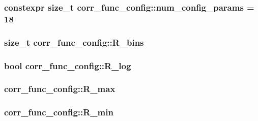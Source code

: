 \subsubsection[{num\+\_\+config\+\_\+params}]{\setlength{\rightskip}{0pt plus 5cm}constexpr size\+\_\+t corr\+\_\+func\+\_\+config\+::num\+\_\+config\+\_\+params = 18\hspace{0.3cm}{\ttfamily [static]}}\label{structcorr__func__config_ad0520000d9935694c994090415c6d08d}
\hypertarget{structcorr__func__config_af53ff82362ef469976b178d875d0b669}{}
\subsubsection[{R\+\_\+bins}]{\setlength{\rightskip}{0pt plus 5cm}size\+\_\+t corr\+\_\+func\+\_\+config\+::\+R\+\_\+bins}\label{structcorr__func__config_af53ff82362ef469976b178d875d0b669}
\hypertarget{structcorr__func__config_a269de7bc2b6288df975786b443001700}{}
\subsubsection[{R\+\_\+log}]{\setlength{\rightskip}{0pt plus 5cm}bool corr\+\_\+func\+\_\+config\+::\+R\+\_\+log}\label{structcorr__func__config_a269de7bc2b6288df975786b443001700}
\hypertarget{structcorr__func__config_aff81b65fcb8bd33994e15cc6e9f055e6}{}
\subsubsection[{R\+\_\+max}]{ corr\+\_\+func\+\_\+config\+::\+R\+\_\+max}\label{structcorr__func__config_aff81b65fcb8bd33994e15cc6e9f055e6}
\hypertarget{structcorr__func__config_a96d6144c4e505099c1cfe7a684bc04fe}{}
\subsubsection[{R\+\_\+min}]{ corr\+\_\+func\+\_\+config\+::\+R\+\_\+min}\label{structcorr__func__config_a96d6144c4e505099c1cfe7a684bc04fe}
\hypertarget{structcorr__func__config_ae9f3db83bee5cac291da7de89bdd6297}{}
